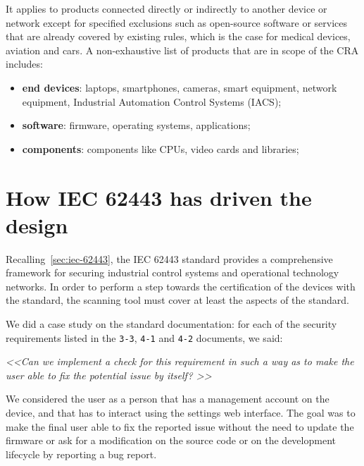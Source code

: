 It applies to products connected directly or indirectly to another device or network except for specified exclusions such as open-source software or services that are already covered by existing rules, which is the case for medical devices, aviation and cars. A non-exhaustive list of products that are in scope of the CRA includes:~\cite{cra-overview}
\begin{itemize}
  \item \textbf{end devices}: laptops, smartphones, cameras, smart equipment, network equipment, Industrial Automation Control Systems (IACS);
  \item \textbf{software}: firmware, operating systems, applications;
  \item \textbf{components}: components like CPUs, video cards and libraries;
\end{itemize}


\section{How IEC 62443 has driven the design}
\label{sec:iec-62443-driven-design}

Recalling~\cref{sec:iec-62443}, the IEC 62443 standard provides a comprehensive framework for securing industrial control systems and operational technology networks. In order to perform a step towards the certification of the devices with the standard, the scanning tool must cover at least the aspects of the standard.

We did a case study on the standard documentation: for each of the security requirements listed in the \texttt{3-3}, \texttt{4-1} and \texttt{4-2} documents, we said:
\begin{mdframed}
  \textit{\textless\textless  Can we implement a check for this requirement in such a way as to make the user able to fix the potential issue by itself? \textgreater\textgreater}
\end{mdframed}
We considered the user as a person that has a management account on the device, and that has to interact using the settings web interface. The goal was to make the final user able to fix the reported issue without the need to update the firmware or ask for a modification on the source code or on the development lifecycle by reporting a bug report.

